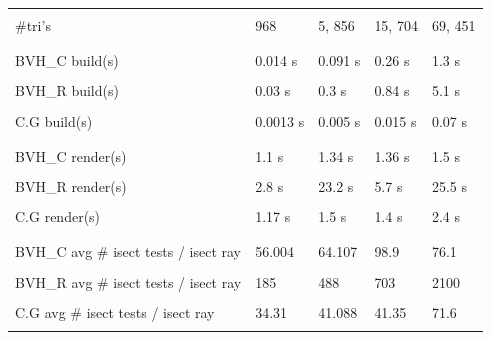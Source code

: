 \documentclass[11pt,a4paper]{article}
\begin{document}
\begin{table}[ht] 
\centering 
{\footnotesize
\begin{tabular}{ P{2.5cm}||P{2.5cm}P{2.5cm} P{2.5cm} P{2.5cm}  }      %
\hline
\\
\#tri's & 968  & 5, 856 & 15, 704 & 69, 451 \\ [0.5ex] %
\\
\hline \hline
\\
BVH\_C build(s)& 0.014 s& 0.091 s & 0.26 s & 1.3 s \\
\\
BVH\_R build(s)& 0.03 s& 0.3 s & 0.84 s & 5.1 s \\
\\
C.G build(s)& 0.0013 s& 0.005 s & 0.015 s & 0.07 s \\
\\
\hline \hline
\\
BVH\_C render(s)& 1.1 s& 1.34 s & 1.36 s & 1.5 s \\
\\
BVH\_R render(s)& 2.8 s& 23.2 s & 5.7 s & 25.5 s \\
\\
C.G render(s)& 1.17 s& 1.5 s & 1.4 s & 2.4 s \\
\\
\hline \hline
\\
BVH\_C avg \# isect tests / isect ray& 56.004& 64.107& 98.9& 76.1 \\
\\
BVH\_R avg \# isect tests / isect ray& 185& 488& 703& 2100 \\
\\
C.G avg \# isect tests / isect ray& 34.31& 41.088& 41.35& 71.6 \\
\\
\hline \hline
    \end{tabular}
}
\end{table}

\pagebreak
\end{document}
